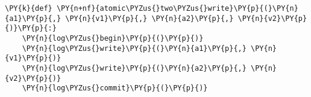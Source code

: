 \begin{BVerbatim}[commandchars=\\\{\}]
\PY{k}{def} \PY{n+nf}{atomic\PYZus{}two\PYZus{}write}\PY{p}{(}\PY{n}{a1}\PY{p}{,} \PY{n}{v1}\PY{p}{,} \PY{n}{a2}\PY{p}{,} \PY{n}{v2}\PY{p}{)}\PY{p}{:}
    \PY{n}{log\PYZus{}begin}\PY{p}{(}\PY{p}{)}
    \PY{n}{log\PYZus{}write}\PY{p}{(}\PY{n}{a1}\PY{p}{,} \PY{n}{v1}\PY{p}{)}
    \PY{n}{log\PYZus{}write}\PY{p}{(}\PY{n}{a2}\PY{p}{,} \PY{n}{v2}\PY{p}{)}
    \PY{n}{log\PYZus{}commit}\PY{p}{(}\PY{p}{)}
\end{BVerbatim}
